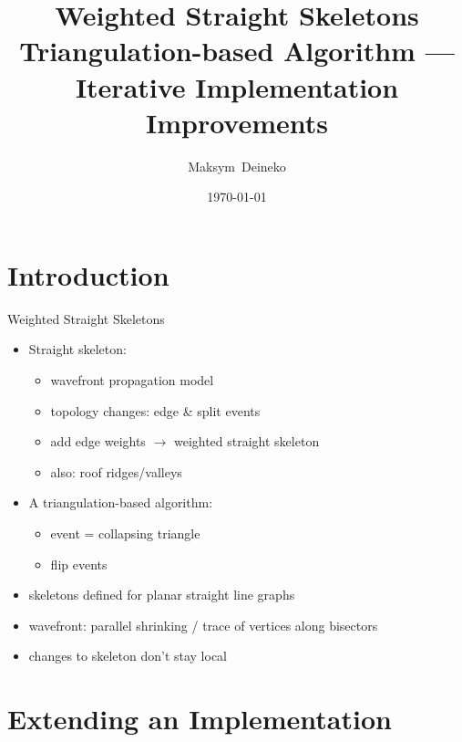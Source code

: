 \documentclass[
  size=9pt,
  style=jefka,
  paper=screen,
  mode=print,
  display=slides,
  nohandoutpagebreaks,
  pauseslide,
  hlsections,
  fleqn,
  dvips,
  clock
]{powerdot}
\title{%
  \vspace{21pt}
  Weighted Straight Skeletons
  \\[12pt]
  {\normalsize Triangulation-based Algorithm --- Iterative Implementation Improvements}
}
\author{%
  Maksym~Deineko \\ {\small \mailto{deineko@student.tugraz.at} }
}
\date{\today}
\begin{document}
\maketitle
{}

\section[template=wideslide]{Introduction}

\begin{slide}{Weighted Straight Skeletons}
  \begin{itemize}
    \item Straight skeleton:
    \begin{itemize}
      \item wavefront propagation model
      \item topology changes: edge \& split events
      \item add edge weights $\rightarrow$ weighted straight skeleton
      \item also: roof ridges/valleys
    \end{itemize}
    \item A triangulation-based algorithm:
    \begin{itemize}
      \item event = collapsing triangle
      \item flip events
    \end{itemize}
  \end{itemize}
\end{slide}
\begin{note}{}
  \begin{itemize}
    \item skeletons defined for planar straight line graphs
    \item wavefront: parallel shrinking / trace of vertices along bisectors
    \item changes to skeleton don't stay local
  \end{itemize}
\end{note}

\section[template=wideslide]{Extending an Implementation}
\end{document}
